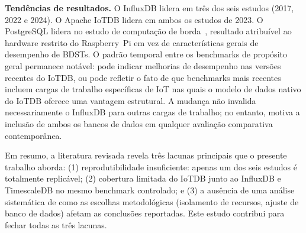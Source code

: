 \textbf{Tendências de resultados.} O InfluxDB lidera em três dos seis estudos (2017, 2022
e 2024). O Apache IoTDB lidera em ambos os estudos de 2023. O PostgreSQL lidera no estudo
de computação de borda~\citep{grzesik2020comparative}, resultado atribuível ao hardware
restrito do Raspberry~Pi em vez de características gerais de desempenho de BDSTs. O padrão
temporal entre os benchmarks de propósito geral permanece notável: pode indicar melhorias de
desempenho nas versões recentes do IoTDB, ou pode refletir o fato de que benchmarks mais
recentes incluem cargas de trabalho específicas de IoT nas quais o modelo de dados nativo do
IoTDB oferece uma vantagem estrutural. A mudança não invalida necessariamente o InfluxDB para
outras cargas de trabalho; no entanto, motiva a inclusão de ambos os bancos de dados em
qualquer avaliação comparativa contemporânea.

Em resumo, a literatura revisada revela três lacunas principais que o presente trabalho aborda:
(1) reprodutibilidade insuficiente: apenas um dos seis estudos é totalmente replicável;
(2) cobertura limitada do IoTDB junto ao InfluxDB e TimescaleDB no mesmo benchmark controlado;
e (3) a ausência de uma análise sistemática de como as escolhas metodológicas (isolamento de
recursos, ajuste de banco de dados) afetam as conclusões reportadas. Este estudo contribui para
fechar todas as três lacunas.

